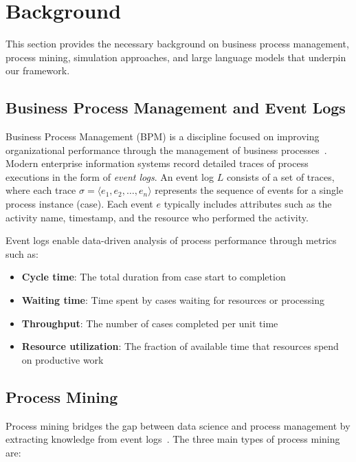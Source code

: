 \documentclass[preprint,12pt]{elsarticle}
\begin{document}
\section{Background}
\label{sec:background}

This section provides the necessary background on business process management, process mining, simulation approaches, and large language models that underpin our framework.

\subsection{Business Process Management and Event Logs}

Business Process Management (BPM) is a discipline focused on improving organizational performance through the management of business processes~\cite{dumas2018fundamentals}. Modern enterprise information systems record detailed traces of process executions in the form of \textit{event logs}. An event log $L$ consists of a set of traces, where each trace $\sigma = \langle e_1, e_2, \ldots, e_n \rangle$ represents the sequence of events for a single process instance (case). Each event $e$ typically includes attributes such as the activity name, timestamp, and the resource who performed the activity.

Event logs enable data-driven analysis of process performance through metrics such as:
\begin{itemize}
    \item \textbf{Cycle time}: The total duration from case start to completion
    \item \textbf{Waiting time}: Time spent by cases waiting for resources or processing
    \item \textbf{Throughput}: The number of cases completed per unit time
    \item \textbf{Resource utilization}: The fraction of available time that resources spend on productive work
\end{itemize}

\subsection{Process Mining}

Process mining bridges the gap between data science and process management by extracting knowledge from event logs~\cite{van2016process}. The three main types of process mining are:
\end{document}
